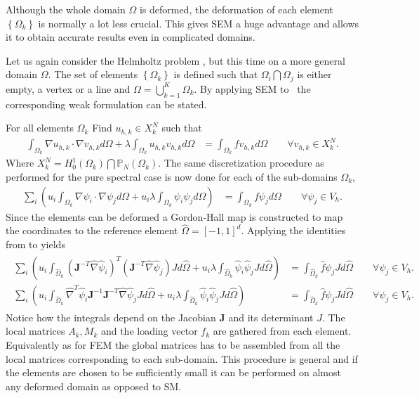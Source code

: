 Although the whole domain $\Omega$ is deformed, the deformation of each
element $\left\{ \Omega_k \right\}$ is normally a lot less crucial. This gives SEM a huge advantage and allows it to 
obtain accurate results even in complicated domains.

Let us again consider the Helmholtz problem , but this time 
on a more general domain $\Omega$. The set of elements $\left\{ \Omega_k \right\}$
is defined such that $\Omega_i\bigcap\Omega_j$ is either empty, a vertex or a line and 
$\Omega = \bigcup^K_{k=1}\Omega_k$.
By applying SEM to~ the corresponding weak formulation can be stated.

For all elements $\Omega_k$ Find $u_{h,k}\in X^N_k$  such that
%
\begin{align}
    \int_{\Omega_k}\nabla u_{h,k} \cdot \nabla v_{h,k} d \Omega
    + \lambda \int_{\Omega_k} u_{h,k} v_{h,k} d \Omega 
    &= \int_{\Omega_k}f v_{h,k}d \Omega \qquad \forall v_{h,k} \in X_k^N.
    \label{eq:HelmholtzweakSEM}
\end{align}
%
Where $X^N_k =  H_0^1(\Omega_k)\bigcap\mathbb{P}_N(\Omega_k)$. The same discretization 
procedure as performed for the pure spectral case is now done for each of the 
sub-domains $\Omega_k$,
%
\begin{align}
    \sum_i\left(  u_i\int_{\Omega_k}\nabla \psi_i \cdot \nabla \psi_j d \Omega + 
    u_i\lambda \int_{\Omega_k} \psi_i \psi_jd \Omega \right)
    &= \int_{\Omega_k}f \psi_jd \Omega \qquad \forall \psi_j \in V_h.
    \label{eq:HelmholtzdiscreteSEM}
\end{align}
%
Since the elements can be deformed a Gordon-Hall map is 
constructed to map the coordinates to the reference element $\hat{\Omega}=[-1,1]^d$.
Applying the identities from  to  yields
%
\begin{align}
    \begin{split}
    \sum_i\left(  u_i\int_{\hat{\Omega}_k}(\mathbf{J}^{-T}\hat{\nabla} \hat{\psi}_i)^T
    (\mathbf{J}^{-T}\hat{\nabla} \hat{\psi}_j) J d \hat{\Omega} + 
    u_i\lambda \int_{\hat{\Omega}_k} \hat{\psi}_i \hat{\psi}_j Jd \hat{\Omega} \right)
    &= \int_{\hat{\Omega}_k}\hat{f} \psi_j J d \hat{\Omega} \qquad \forall \psi_j \in V_h.  \\
    \sum_i\left(  u_i\int_{\hat{\Omega}_k}\hat{\nabla}^T \hat{\psi}_i\mathbf{J}^{-1}
    \mathbf{J}^{-T}\hat{\nabla} \hat{\psi}_j J d \hat{\Omega} + 
    u_i\lambda \int_{\hat{\Omega}_k} \hat{\psi}_i \hat{\psi}_j Jd \hat{\Omega} \right)
    &= \int_{\hat{\Omega}_k}\hat{f} \psi_j J d \hat{\Omega} \qquad \forall \psi_j \in V_h.
    \end{split}
    \label{eq:HelmholtzrefSEM}
\end{align}
%
Notice how the integrals depend on the Jacobian $\mathbf{J}$ and its determinant $J$.
The local matrices $A_k,M_k$ and the loading vector $f_k$ are gathered from each element.
Equivalently as for FEM the global matrices has to be assembled
from all the local matrices corresponding to each sub-domain. This procedure is general and 
if the elements are chosen to be sufficiently small it can 
be performed on almost any deformed domain as opposed to SM. 


